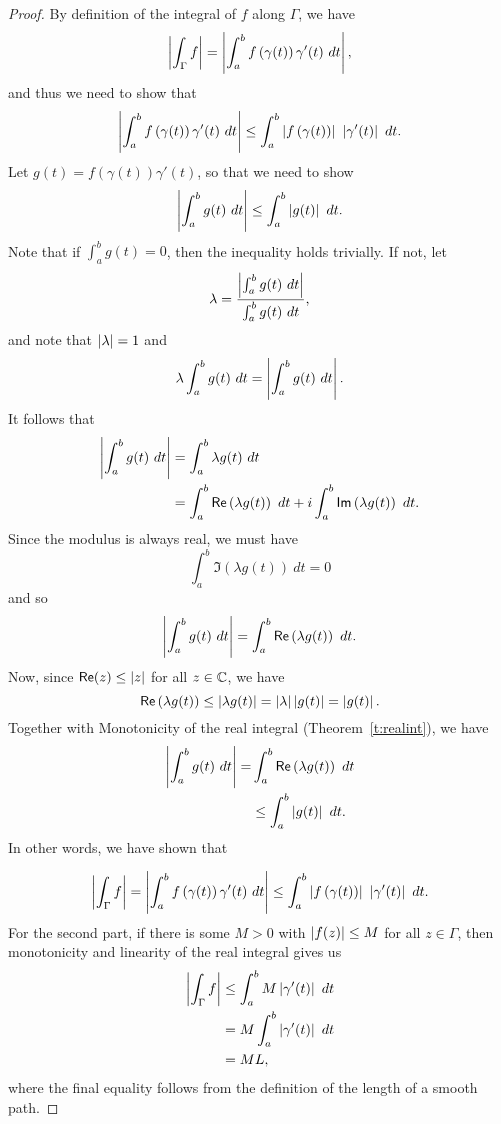 \begin{proof}
By definition of the integral of $f$ along $\Gamma$, we have
\[
\left|  \int_{\Gamma} f  \right| = \left|  \int_a^b f \left( \gamma(t) \right) \gamma' (t)\ dt  \right|,
\]
and thus we need to show that
\[
\left|  \int_a^b f \left( \gamma (t) \right) \gamma'(t)\ dt  \right| \leq \int_a^b \left|  f \left( \gamma (t) \right)  \right|\ \left|  \gamma'(t)  \right|\ dt.
\]
Let $g(t)=f(\gamma(t))\gamma'(t)$, so that we need to show
\[
\abs{\int_a^b g(t)\ dt } \leq \int_a^b \abs{g(t)}\ dt.
\]
Note that if $\int_a^b g(t) = 0$, then the inequality holds trivially.  If not, let
\[
\lambda = \frac{\left| \int_a^b g(t)\ dt \right|}{\int_a^b g(t)\ dt},
\]
and note that $\left| \lambda \right| = 1$ and
\[
\lambda \int_a^b g(t)\ dt = \abs{ \int_a^b g(t)\ dt }.
\]
It follows that
\begin{align*}
\left| \int_a^b g(t)\ dt  \right| &= \int_a^b \lambda g(t)\ dt  \\
& = \int_a^b \textsf{Re} \left( \lambda g(t) \right)\ dt + i \int_a^b \textsf{Im} \left( \lambda g(t) \right)\ dt.
\end{align*}
Since the modulus is always real, we must have
\[
\int_a^b \Im \left( \lambda g(t) \right)\ dt =0
\]
and so
\[
\left| \int_a^b g(t)\ dt  \right| = \int_a^b \textsf{Re} \left( \lambda g(t) \right)\ dt.
\]
Now, since $\textsf{Re} (z) \leq \left| z \right|$ for all $z \in \mathbb{C}$, we have
\[
\textsf{Re} \left( \lambda g(t) \right) \leq \left| \lambda g(t)  \right| = \left| \lambda \right| \left| g(t) \right| = \left| g(t) \right|.
\]
Together with Monotonicity of the real integral (Theorem~\ref{t:realint}), we have
\begin{align*}
\left|  \int_a^b g(t)\ dt  \right| =&  \int_a^b \textsf{Re} \left( \lambda g(t) \right)\ dt \\
& \leq \int_a^b \left| g(t) \right|\ dt.
\end{align*}
In other words, we have shown that

\[
\left| \int_{\Gamma} f  \right| = \left|  \int_a^b f \left( \gamma (t) \right) \gamma'(t)\ dt  \right| \leq \int_a^b \left|  f \left( \gamma (t) \right)  \right|\ \left|  \gamma'(t)  \right|\ dt.
\]
  For the second part, if there is some $M>0$ with $\left| f(z) \right| \leq M$ for all $z \in \Gamma$, then monotonicity and linearity of the real integral gives us
  \begin{align*}
  \left| \int_{\Gamma} f  \right| & \leq \int_a^b M \left|  \gamma ' (t)  \right| \ dt \\
  & = M \int_a^b \left| \gamma ' (t) \right|\ dt \\
  & = M L,
  \end{align*}
where the final equality follows from the definition of the length of a smooth path.
\end{proof}
